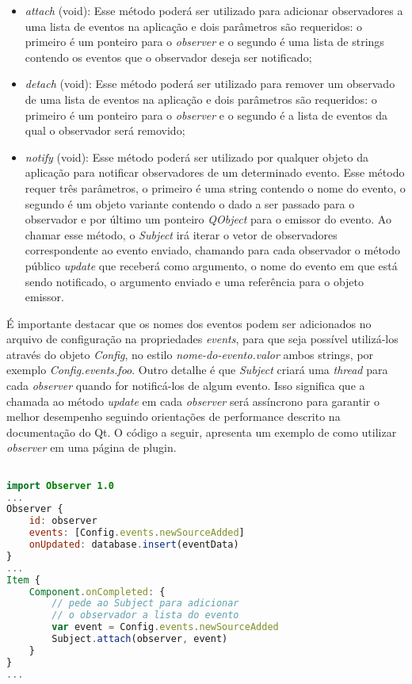 \begin{itemize}
	\item \textit{attach} (void): Esse método poderá ser utilizado para adicionar observadores a uma lista de eventos na aplicação e dois parâmetros são requeridos: o primeiro é um ponteiro para o \textit{observer} e o segundo é uma lista de strings contendo os eventos que o observador deseja ser notificado;
	\item \textit{detach} (void): Esse método poderá ser utilizado para remover um observado de uma lista de eventos na aplicação e dois parâmetros são requeridos: o primeiro é um ponteiro para o \textit{observer} e o segundo é a lista de eventos da qual o observador será removido;
	\item \textit{notify} (void): Esse método poderá ser utilizado por qualquer objeto da aplicação para notificar observadores de um determinado evento. Esse método requer três parâmetros, o primeiro é uma string contendo o nome do evento, o segundo é um objeto variante contendo o dado a ser passado para o observador e por último um ponteiro \textit{QObject} para o emissor do evento. Ao chamar esse método, o \textit{Subject} irá iterar o vetor de observadores correspondente ao evento enviado, chamando para cada observador o método público \textit{update} que receberá como argumento, o nome do evento em que está sendo notificado, o argumento enviado e uma referência para o objeto emissor.
\end{itemize}

É importante destacar que os nomes dos eventos podem ser adicionados no arquivo de configuração na propriedades \textit{events}, para que seja possível utilizá-los através do objeto \textit{Config}, no estilo \textit{nome-do-evento.valor} ambos strings, por exemplo \textit{Config.events.foo}. Outro detalhe é que \textit{Subject} criará uma \textit{thread} para cada \textit{observer} quando for notificá-los de algum evento. Isso significa que a chamada ao método \textit{update} em cada \textit{observer} será assíncrono para garantir o melhor desempenho seguindo orientações de performance descrito na documentação do Qt. O código a seguir, apresenta um exemplo de como utilizar \textit{observer} em uma página de plugin.

\begin{center}
\begin{lstlisting}[language=qml]

import Observer 1.0
...
Observer {
	id: observer
	events: [Config.events.newSourceAdded]
	onUpdated: database.insert(eventData)
}
...
Item {
	Component.onCompleted: {
		// pede ao Subject para adicionar
		// o observador a lista do evento
		var event = Config.events.newSourceAdded
		Subject.attach(observer, event)
	}
}
...
\end{lstlisting}
\end{center}


